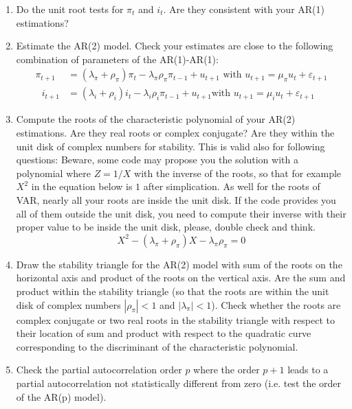 \documentclass[12pt,a4paper]{article}%
\begin{document}
\begin{enumerate}
\item Do the unit root tests for $\pi_{t}$ and $i_{t}$. Are they consistent
with your AR(1) estimations?

\item Estimate the AR(2) model. Check your estimates are close to the
following combination of parameters of the AR(1)-AR(1):
\begin{align*}
\pi_{t+1} &  =\left(  \lambda_{\pi}+\rho_{\pi}\right)  \pi_{t}-\lambda_{\pi
}\rho_{\pi}\pi_{t-1}+u_{t+1}\text{ with }u_{t+1}=\mu_{\pi}u_{t}+\varepsilon
_{t+1}\\
\text{ }i_{t+1} &  =\left(  \lambda_{i}+\rho_{i}\right)  i_{t}-\lambda_{i}%
\rho_{i}\pi_{t-1}+u_{t+1}\text{with }u_{t+1}=\mu_{i}u_{t}+\varepsilon_{t+1}%
\end{align*}


\item Compute the roots of the characteristic polynomial of your AR(2)
estimations. Are they real roots or complex conjugate? Are they within the
unit disk of complex numbers for stability. This is valid also for following
questions: Beware, some code may propose you the solution with a polynomial
where $Z=1/X$ with the inverse of the roots, so that for example $X^{2}$ in
the equation below is $1$ after simplication. As well for the roots of VAR,
nearly all your roots are inside the unit disk. If the code provides you all
of them outside the unit disk, you need to compute their inverse with their
proper value to be inside the unit disk, please, double check and think.
\[
X^{2}-\left(  \lambda_{\pi}+\rho_{\pi}\right)  X-\lambda_{\pi}\rho_{\pi}=0
\]


\item Draw the stability triangle for the AR(2) model with sum of the roots on
the horizontal axis and product of the roots on the vertical axis. Are the sum
and product within the stability triangle (so that the roots are within the
unit disk of complex numbers $\left\vert \rho_{\pi}\right\vert <1$ and
$\left\vert \lambda_{\pi}\right\vert <1$). Check whether the roots are complex
conjugate or two real roots in the stability triangle with respect to their
location of sum and product with respect to the quadratic curve corresponding
to the discriminant of the characteristic polynomial.

\item Check the partial autocorrelation order $p$ where the order $p+1$ leads
to a partial autocorrelation not statistically different from zero (i.e. test
the order of the AR(p) model).


\end{enumerate}
\end{document}
